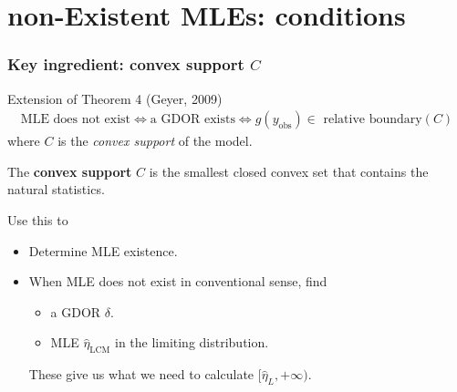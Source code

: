 \documentclass[ 10pt]{beamer}
\newcommand{\etaLCM}{\hat{\eta}_{\textrm{LCM}}}
\newcommand{\yobs}{y_{\text{obs}}}
\begin{document}
\section{non-Existent MLEs: conditions}
\frame
{
  \frametitle{Key ingredient: convex support $C$}  
\begin{block}{Extension of Theorem 4 (Geyer, 2009)}
\begin{align*}
\text{MLE does not exist} \iff \text{a GDOR exists} \iff \text{$g(\yobs) \in$ relative boundary$(C)$}
\end{align*}
where  $C$ is the \emph{convex support} of the model.
\end{block}
\vspace{2mm}

The \textbf{convex support} $C$ is the smallest closed convex set that contains the natural statistics.
\vspace{2mm}

\pause
Use this to
\begin{itemize}
\item Determine MLE existence.
\item When MLE does not exist in conventional sense, find
\begin{itemize}
	\item	a GDOR $\delta$.
	\item 	MLE $\etaLCM$ in the limiting distribution.
\end{itemize}
	These give us what we need to calculate $[\hat{\eta}_L, +\infty)$.
\end{itemize}

}
\end{document}
